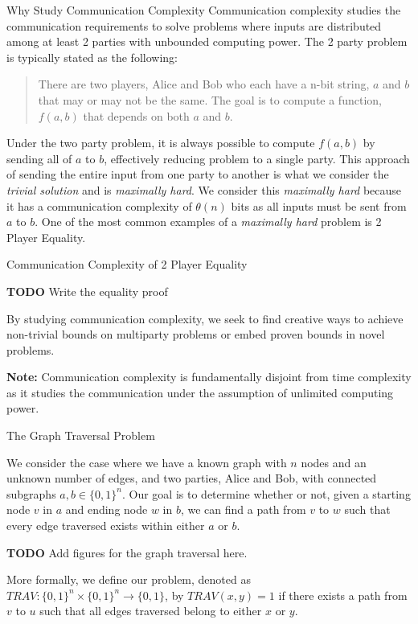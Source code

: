 
  \begin{block}{Why Study Communication Complexity}
    Communication complexity studies the communication requirements to solve problems where inputs are distributed among at least 2 parties with unbounded computing power. The 2 party problem is typically stated as the following:
    \vskip0.2in
    \begin{quote}
        There are two players, Alice and Bob who each have a n-bit string, $a$ and $b$ that may or may not be the same. The goal is to compute a function, $f(a, b)$ that depends on both $a$ and $b$.
    \end{quote}
    \vskip-0.2in
    Under the two party problem, it is always possible to compute $f(a,b)$ by sending all of $a$ to $b$, effectively reducing problem to a single party. This approach of sending the entire input from one party to another is what we consider the \textit{trivial solution} and is \textit{maximally hard}. We consider this \textit{maximally hard} because it has a communication complexity of $\theta (n)$ bits as all inputs must be sent from $a$ to $b$. One of the most common examples of a \textit{maximally hard} problem is 2 Player Equality.
    \begin{exampleblock}{Communication Complexity of 2 Player Equality}

    \textbf{TODO} Write the equality proof
    
    \end{exampleblock}
    By studying communication complexity, we seek to find creative ways to achieve non-trivial bounds on multiparty problems or embed proven bounds in novel problems.

    \textbf{Note:} Communication complexity is fundamentally disjoint from time complexity as it studies the communication under the assumption of unlimited computing power.
  \end{block}


  \begin{block}{The Graph Traversal Problem}

    We consider the case where we have a known graph with $n$ nodes and an unknown number of edges, and two parties, Alice and Bob, with connected subgraphs $a, b \in \{0,1\}^n$. Our goal is to determine whether or not, given a starting node $v$ in $a$ and ending node $w$ in $b$, we can find a path from $v$ to $w$ such that every edge traversed exists within either $a$ or $b$. 
    
    \textbf{TODO} Add figures for the graph traversal here. 

    More formally, we define our problem, denoted as $TRAV:\{0,1\}^n \times \{0,1\}^n \rightarrow \{0,1\}$, by $TRAV(x,y)=1$ if there exists a path from $v$ to $u$ such that all edges traversed belong to either $x$ or $y$.
 
  \end{block}
